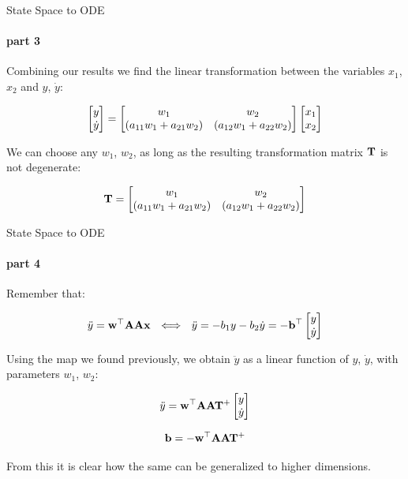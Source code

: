 \documentclass{beamer}
\begin{document}
\begin{frame}{State Space to ODE}
\framesubtitle{part 3}
\begin{flushleft}

Combining our results we find the linear transformation between the variables $x_1$, $x_2$ and $y$, $\dot y$:

\begin{equation}
\begin{bmatrix} y \\ \dot y \end{bmatrix} = 
\begin{bmatrix} w_1 & w_2 \\ (a_{11}w_1 + a_{21}w_2) & (a_{12}w_1 + a_{22}w_2) \end{bmatrix}
\begin{bmatrix} x_1 \\ x_2 \end{bmatrix}    
\end{equation}

We can choose any $w_1$, $w_2$, as long as the resulting transformation matrix $\mathbf{T}$ is not degenerate:

\begin{equation}
\mathbf{T} = 
\begin{bmatrix} w_1 & w_2 \\ (a_{11}w_1 + a_{21}w_2) & (a_{12}w_1 + a_{22}w_2) \end{bmatrix}
\end{equation}

\end{flushleft}
\end{frame}



\begin{frame}{State Space to ODE}
\framesubtitle{part 4}
\begin{flushleft}

Remember that:

\begin{equation}
    \ddot y = \bo{w}^\top \bo{A} \bo{A} \bo{x} \ \ 
    \Longleftrightarrow \ \ 
    \ddot{y} = -b_1 y -b_2 \dot{y}  = -\bo{b}^\top \myvec{y}{\dot y}
\end{equation}

Using the map we found previously, we obtain $\ddot y$ as a linear function of $y$, $\dot y$, with parameters $w_1$, $w_2$:

\begin{equation}
    \ddot y = \mathbf{w}^\top \mathbf{A} \mathbf{A} \mathbf{T}^+ \begin{bmatrix} y \\ \dot y \end{bmatrix}
\end{equation}

\begin{equation}
    \mathbf{b} = -\mathbf{w}^\top \mathbf{A} \mathbf{A} \mathbf{T}^+
\end{equation}

From this it is clear how the same can be generalized to higher dimensions.

\end{flushleft}
\end{frame}
\end{document}
